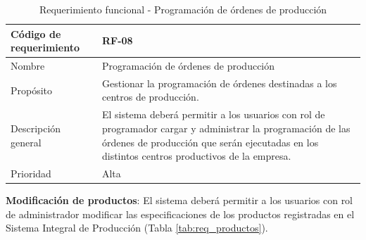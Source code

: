 \begin{table}[H]
    \centering
    \caption{Requerimiento funcional - Programación de órdenes de producción}
    \label{tab:req_ordenes}
    \begin{tabularx}{\textwidth}{|X|X|}
        \hline
        Código de requerimiento & RF-08                                                                                                                                                                                                       \\ \hline
        Nombre                  & Programación de órdenes de producción                                                                                                                                                                       \\ \hline
        Propósito               & Gestionar la programación de órdenes destinadas a los centros de producción.                                                                                                                                \\ \hline
        Descripción general     & El sistema deberá permitir a los usuarios con rol de programador cargar y administrar la programación de las órdenes de producción que serán ejecutadas en los distintos centros productivos de la empresa. \\ \hline
        Prioridad               & Alta                                                                                                                                                                                                        \\ \hline
    \end{tabularx}
\end{table}


\textbf{Modificación de productos}: El sistema deberá permitir a los usuarios con rol de administrador modificar las especificaciones de los productos registradas en el Sistema Integral de Producción (Tabla \ref{tab:req_productos}).

